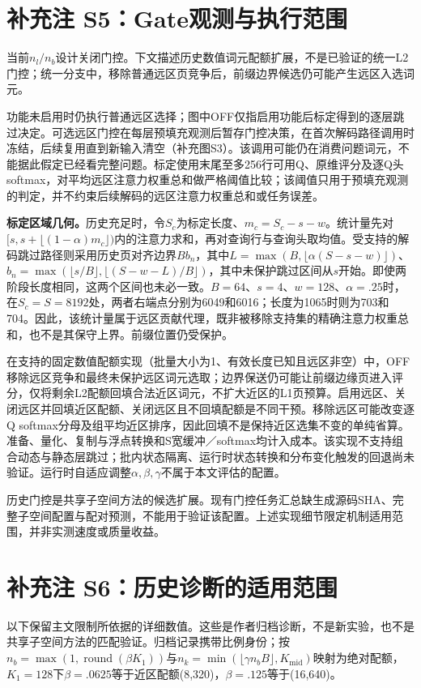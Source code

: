\documentclass[10pt,letterpaper]{article}
\begin{document}
\section*{补充注 S5：Gate观测与执行范围}
当前$n_l/n_b$设计关闭门控。下文描述历史数值词元配额扩展，不是已验证的统一L2门控；统一分支中，移除普通远区页竞争后，前缀边界候选仍可能产生远区入选词元。


功能未启用时仍执行普通远区选择；图中OFF仅指启用功能后标定得到的逐层跳过决定。可选远区门控在每层预填充观测后暂存门控决策，在首次解码路径调用时冻结，后续复用直到新输入清空（补充图S3）。该调用可能仍在消费问题词元，不能据此假定已经看完整问题。标定使用末尾至多256行可用Q、原维评分及逐Q头softmax，对平均远区注意力权重总和做严格阈值比较；该阈值只用于预填充观测的判定，并不约束后续解码的远区注意力权重总和或任务误差。

\textbf{标定区域几何。}历史充足时，令$S_c$为标定长度、$m_c=S_c-s-w$。统计量先对$[s,s+\lfloor(1-\alpha)m_c\rfloor)$内的注意力求和，再对查询行与查询头取均值。受支持的解码跳过路径则采用历史页对齐边界$Bb_n$，其中$L=\max(B,\lfloor\alpha(S-s-w)\rfloor)$、$b_n=\max(\lfloor s/B\rfloor,\lfloor(S-w-L)/B\rfloor)$，其中未保护跳过区间从$s$开始。即使两阶段长度相同，这两个区间也未必一致。$B=64$、$s=4$、$w=128$、$\alpha=.25$时，在$S_c=S=8192$处，两者右端点分别为6049和6016；长度为1065时则为703和704。因此，该统计量属于远区贡献代理，既非被移除支持集的精确注意力权重总和，也不是其保守上界。前缀位置仍受保护。

在支持的固定数值配额实现（批量大小为1、有效长度已知且远区非空）中，OFF移除远区竞争和最终未保护远区词元选取；边界保送仍可能让前缀边缘页进入评分，仅将剩余L2配额回填合法近区词元，不扩大近区的L1页预算。启用远区、关闭远区并回填近区配额、关闭远区且不回填配额是不同干预。移除远区可能改变逐Q softmax分母及组平均近区排序，因此回填不是保持近区选集不变的单纯省算。准备、量化、复制与浮点转换和S宽缓冲／softmax均计入成本。该实现不支持组合动态与静态层跳过；批内状态隔离、运行时状态转换和分布变化触发的回退尚未验证。运行时自适应调整$\alpha,\beta,\gamma$不属于本文评估的配置。


历史门控是共享子空间方法的候选扩展。现有门控任务汇总缺生成源码SHA、完整子空间配置与配对预测，不能用于验证该配置。上述实现细节限定机制适用范围，并非实测速度或质量收益。

\clearpage
\section*{补充注 S6：历史诊断的适用范围}
以下保留主文限制所依据的详细数值。这些是作者归档诊断，不是新实验，也不是共享子空间方法的匹配验证。归档记录携带比例身份；按$n_b=\max(1,\operatorname{round}(\beta K_1))$与$n_k=\min(\lfloor\gamma n_bB\rfloor,K_{\mathrm{mid}})$映射为绝对配额，$K_1=128$下$\beta=.0625$等于近区配额(8,320)，$\beta=.125$等于(16,640)。
\end{document}
